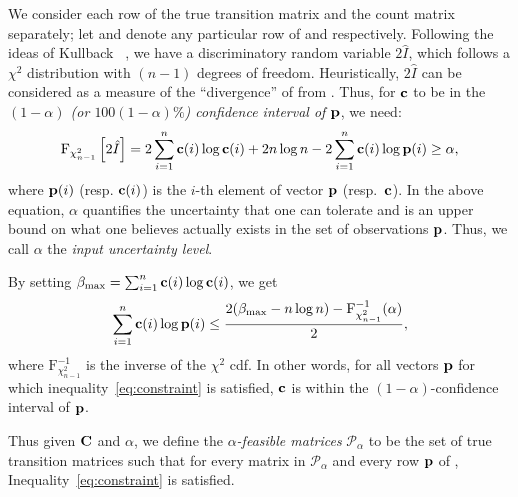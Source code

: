 We consider each row of the true transition matrix and the count matrix
separately; let {\rowp} and {\rowc} denote
any particular row of {\truetransitionmatrix} and {\countmatrix} respectively.  
Following the ideas of Kullback {\etal}~\cite{kullback62tests}, we have a discriminatory random variable $2\hat{I}$, which follows a $\chi^2$ distribution with $(n-1)$ degrees of freedom. Heuristically, $2\hat{I}$ can be considered as a measure of the ``divergence'' of {\rowc} from {\rowp}.
Thus, 
for $\mathbf{c}$ to be in the  \emph{$(1-\alpha)$ (or $100(1-\alpha)\%$) 
confidence interval of $\mathbf{p}$}, we need:
\begin{equation*}\label{eq:ul}
\text{F}_{\chi^2_{n-1}}\left[2\hat{I}\right] =  2\sum_{i=1}^n\mathbf{c}(i)\log\mathbf{c}(i)+2n\log n -2\sum_{i=1}^n\mathbf{c}(i)\log\mathbf{p}(i) \geq \alpha,
\end{equation*}
where 
 $\mathbf{p}(i)$ (resp. $\mathbf{c}(i)$) is the $i$-th element of vector $\mathbf{p}$ (resp.\ $\mathbf{c}$).
 In the above equation, $\alpha$ quantifies the uncertainty that
 one can tolerate and is an upper bound on what one believes actually exists in the set of observations $\mathbf{p}$. 
Thus, we call $\alpha$ the \emph{input uncertainty level}.
 
By setting $\beta_\text{max} = \sum_{i=1}^n\mathbf{c}(i)\log \mathbf{c}(i)$,
we get
\begin{equation}\label{eq:constraint}
\sum_{i=1}^n\mathbf{c}(i)\log\mathbf{p}(i) \leq \frac{2(\beta_\text{max}-n\log n)-\text{F}^{-1}_{\chi^2_{n-1}}(\alpha)}{2},
\end{equation}
where $\text{F}^{-1}_{\chi^2_{n-1}}$ is the inverse of the $\chi^2$ cdf. 
In other words, for all vectors $\mathbf{p}$ for which inequality~\eqref{eq:constraint}
is satisfied, $\mathbf{c}$ is within the $(1-\alpha)$-confidence interval of $\mathbf{p}$.

Thus given ${\mathbf{C}}$ and $\alpha$, we define 
the \emph{$\alpha$-feasible
matrices} $\mathcal{P}_{\alpha}$ to be 
the 
set of true transition matrices  such that
for every matrix {\truetransitionmatrix} in $\mathcal{P}_{\alpha}$
and every row $\mathbf{p}$ of {\truetransitionmatrix}, Inequality~\eqref{eq:constraint}
is satisfied.




